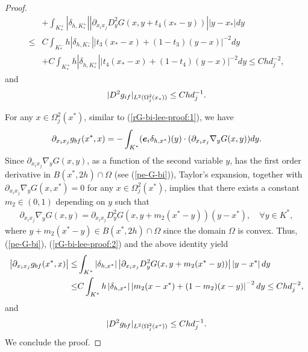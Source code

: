 \documentclass[10pt,a4paper]{amsart}
\begin{document}
\begin{proof}
\begin{align*}
&+\int_{K^+_{\ast}}\left|\delta_{h,K^+_{\ast}}\right|\left|\partial_{x_ix_j}D^2_y G(x,y+t_4(x_{\ast}-y))\right|\left|y-x_{\ast}\right| dy\\
\leq&C\int_{K^-_{\ast}}h\left|\delta_{h,K^-_{\ast}}\right|\left|t_3(x_{\ast}-x)+(1-t_3)(y-x)\right|^{-2} dy\\
&+C\int_{K^+_{\ast}}h\left|\delta_{h,K^+_{\ast}}\right|\left|t_4(x_{\ast}-x)+(1-t_4)(y-x)\right|^{-2} dy\leq Chd_j^{-2},
\end{align*}
and
\begin{align*}
|D^2 g_{{\rm if}}|_{L^2(\Omega_j^2(x_{\ast}))}\leq Chd_j^{-1}.
\end{align*}

For any $x\in\Omega_j^2(x^{\ast})$, similar to (\ref{rG-bi-lee-proof:1}), we have
\begin{align}
\partial_{x_ix_j}g_{{\rm bf}}(x^{\ast},x)=-\int_{K^{\ast}}({\bm e}_i\delta_{h,x^{\ast}})(y)\cdot(\partial_{x_ix_j}\nabla_yG(x,y)) dy.\label{rG-bi-lee-proof:2}
\end{align}
Since $\partial_{x_ix_j}\nabla_yG(x,y)$, as a function of the second variable $y$, has the first order derivative in $B(x^{\ast},2h)\cap\Omega$ (see (\ref{pe-G-bi})),
Taylor's expansion, together with $\partial_{x_ix_j}\nabla_yG(x,x^{\ast})=0$ for any $x\in\Omega_j^2(x^{\ast})$, implies that there exists a constant
$m_2\in(0,1)$ depending on $y$ such that
\begin{align*}
\partial_{x_ix_j}\nabla_yG(x,y)=\partial_{x_ix_j}D_y^2G(x,y+m_2(x^{\ast}-y))(y-x^{\ast}),\quad \forall y\in K^{\ast},
\end{align*}
where $y+m_2(x^{\ast}-y)\in B(x^{\ast},2h)\cap\Omega$ since the domain $\Omega$ is convex.
Thus, (\ref{pe-G-bi}), (\ref{rG-bi-lee-proof:2}) and the above identity yield
\begin{align*}
\left|\partial_{x_ix_j}g_{{\rm bf}}(x^{\ast},x)\right|\leq&\int_{K^{\ast}}\left|\delta_{h,x^{\ast}}\right|\left|\partial_{x_ix_j}D_y^2G(x,y+m_2(x^{\ast}-y))\right|\left|y-x^{\ast}\right|dy\\
\leq&C\int_{K^{\ast}}h\left|\delta_{h,x^{\ast}}\right|\left|m_2(x-x^{\ast})+(1-m_2)(x-y)\right|^{-2} dy\leq Chd_j^{-2},
\end{align*}
and
\begin{align*}
|D^2 g_{{\rm bf}}|_{L^2(\Omega_j^2(x^{\ast}))}\leq Chd_j^{-1}.
\end{align*}
We conclude the proof.
\end{proof}
\end{document}
